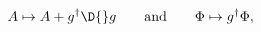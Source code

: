 \begin{equation}\label{eq:gt}
 A\mapsto A+g^\dagger\D{}g\qquad\text{and}\qquad \Phi\mapsto
 g^\dagger\Phi,
\end{equation}

